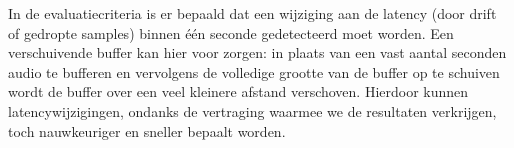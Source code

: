 In de evaluatiecriteria is er bepaald dat een wijziging aan de latency (door drift of gedropte samples) binnen één seconde gedetecteerd moet worden. Een verschuivende buffer kan hier voor zorgen: in plaats van een vast aantal seconden audio te bufferen en vervolgens de volledige grootte van de buffer op te schuiven wordt de buffer over een veel kleinere afstand verschoven. Hierdoor kunnen latencywijzigingen, ondanks de vertraging waarmee we de resultaten verkrijgen, toch nauwkeuriger en sneller bepaalt worden.
